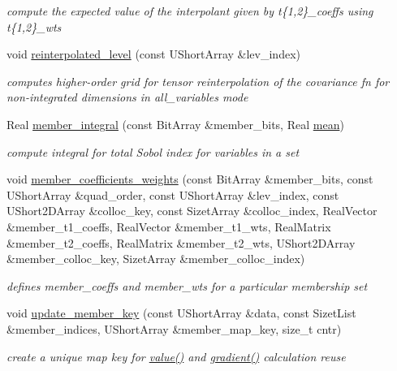 \begin{DoxyCompactItemize}
\begin{DoxyCompactList}\small\item\em compute the expected value of the interpolant given by t\{1,2\}\+\_\+coeffs using t\{1,2\}\+\_\+wts \end{DoxyCompactList}\item 
void \hyperlink{classPecos_1_1NodalInterpPolyApproximation_ae4a694a92e56149b20cf5b7450d3518a}{reinterpolated\+\_\+level} (const U\+Short\+Array \&lev\+\_\+index)
\begin{DoxyCompactList}\small\item\em computes higher-\/order grid for tensor reinterpolation of the covariance fn for non-\/integrated dimensions in all\+\_\+variables mode \end{DoxyCompactList}\item 
Real \hyperlink{classPecos_1_1NodalInterpPolyApproximation_acabcaa681df99b0bb8f2daed023abc1b}{member\+\_\+integral} (const Bit\+Array \&member\+\_\+bits, Real \hyperlink{classPecos_1_1NodalInterpPolyApproximation_adc6f262952d05a33ff68cae37929cbb2}{mean})
\begin{DoxyCompactList}\small\item\em compute integral for total Sobol\textquotesingle{} index for variables in a set \end{DoxyCompactList}\item 
void \hyperlink{classPecos_1_1NodalInterpPolyApproximation_a141b7db5079aa372a5f8727ea856679e}{member\+\_\+coefficients\+\_\+weights} (const Bit\+Array \&member\+\_\+bits, const U\+Short\+Array \&quad\+\_\+order, const U\+Short\+Array \&lev\+\_\+index, const U\+Short2\+D\+Array \&colloc\+\_\+key, const Sizet\+Array \&colloc\+\_\+index, Real\+Vector \&member\+\_\+t1\+\_\+coeffs, Real\+Vector \&member\+\_\+t1\+\_\+wts, Real\+Matrix \&member\+\_\+t2\+\_\+coeffs, Real\+Matrix \&member\+\_\+t2\+\_\+wts, U\+Short2\+D\+Array \&member\+\_\+colloc\+\_\+key, Sizet\+Array \&member\+\_\+colloc\+\_\+index)\label{classPecos_1_1NodalInterpPolyApproximation_a141b7db5079aa372a5f8727ea856679e}

\begin{DoxyCompactList}\small\item\em defines member\+\_\+coeffs and member\+\_\+wts for a particular membership set \end{DoxyCompactList}\item 
void \hyperlink{classPecos_1_1NodalInterpPolyApproximation_acc8e046d91e34a5404891d6bd48aa2d0}{update\+\_\+member\+\_\+key} (const U\+Short\+Array \&data, const Sizet\+List \&member\+\_\+indices, U\+Short\+Array \&member\+\_\+map\+\_\+key, size\+\_\+t cntr)\label{classPecos_1_1NodalInterpPolyApproximation_acc8e046d91e34a5404891d6bd48aa2d0}

\begin{DoxyCompactList}\small\item\em create a unique map key for \hyperlink{classPecos_1_1NodalInterpPolyApproximation_a7bc9dcdf32fc46f97e286268c1ac51b0}{value()} and \hyperlink{classPecos_1_1PolynomialApproximation_a42bf374bf23c32c941ee2acae5ad56a4}{gradient()} calculation reuse \end{DoxyCompactList}\end{DoxyCompactItemize}

